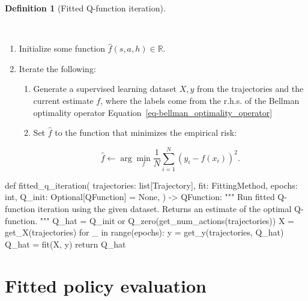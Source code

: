 \documentclass[
  letterpaper,
  DIV=11,
  numbers=noendperiod]{scrreprt}
\newenvironment{Shaded}{\begin{snugshade}}{\end{snugshade}}
\newcommand{\NormalTok}[1]{\textcolor[rgb]{0.00,0.23,0.31}{#1}}
\providecommand{\tightlist}{%
  \setlength{\itemsep}{0pt}\setlength{\parskip}{0pt}}\usepackage{longtable,booktabs,array}
\theoremstyle{plain}
\theoremstyle{plain}
\theoremstyle{definition}
\theoremstyle{definition}
\newtheorem{definition}{Definition}[chapter]
\theoremstyle{remark}
\begin{document}
\begin{definition}[Fitted Q-function
iteration]\protect\hypertarget{def-fitted_q_iteration}{}\label{def-fitted_q_iteration}

~

\begin{enumerate}
\def\labelenumi{\arabic{enumi}.}
\tightlist
\item
  Initialize some function \(\hat f(s, a, h) \in \mathbb{R}\).
\item
  Iterate the following:

  \begin{enumerate}
  \def\labelenumii{\arabic{enumii}.}
  \item
    Generate a supervised learning dataset \(X, y\) from the
    trajectories and the current estimate \(f\), where the labels come
    from the r.h.s. of the Bellman optimality operator
    Equation~\ref{eq-bellman_optimality_operator}
  \item
    Set \(\hat f\) to the function that minimizes the empirical risk:

    \[\hat f \gets \arg\min_f \frac{1}{N} \sum_{i=1}^N (y_i - f(x_i))^2.\]
  \end{enumerate}
\end{enumerate}

\end{definition}

\begin{Shaded}
\begin{Highlighting}[]
\NormalTok{def fitted\_q\_iteration(}
\NormalTok{    trajectories: list[Trajectory],}
\NormalTok{    fit: FittingMethod,}
\NormalTok{    epochs: int,}
\NormalTok{    Q\_init: Optional[QFunction] = None,}
\NormalTok{) {-}\textgreater{} QFunction:}
\NormalTok{    """}
\NormalTok{    Run fitted Q{-}function iteration using the given dataset.}
\NormalTok{    Returns an estimate of the optimal Q{-}function.}
\NormalTok{    """}
\NormalTok{    Q\_hat = Q\_init or Q\_zero(get\_num\_actions(trajectories))}
\NormalTok{    X = get\_X(trajectories)}
\NormalTok{    for \_ in range(epochs):}
\NormalTok{        y = get\_y(trajectories, Q\_hat)}
\NormalTok{        Q\_hat = fit(X, y)}
\NormalTok{    return Q\_hat}
\end{Highlighting}
\end{Shaded}

\section{Fitted policy evaluation}\label{sec-fitted-pi-eval}
\end{document}
